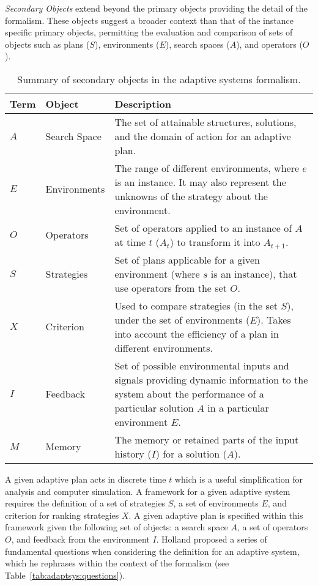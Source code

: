 \documentclass[a4paper, 11pt]{article}
\begin{document}
\emph{Secondary Objects} extend beyond the primary objects providing the detail of the formalism. These objects suggest a broader context than that of the instance specific primary objects, permitting the evaluation and comparison of sets of objects such as plans ($S$), environments ($E$), search spaces ($A$), and operators ($O$).

\begin{table}[ht]
	\centering\small
		\begin{tabularx}{\textwidth}{llX}
		\toprule
		\textbf{Term} & \textbf{Object} & \textbf{Description} \\ 
		\toprule
		$A$ & Search Space & The set of attainable structures, solutions, and the domain of action for an adaptive plan. \\ 
		\midrule
		$E$ & Environments & The range of different environments, where $e$ is an instance. It may also represent the unknowns of the strategy about the environment.  \\ 
		\midrule
		$O$ & Operators & Set of operators applied to an instance of $A$ at time $t$ ($A_t$) to transform it into $A_{t+1}$. \\ 
		\midrule
		$S$ & Strategies & Set of plans applicable for a given environment (where $s$ is an instance), that use operators from the set $O$.  \\ 
		\midrule
		$X$ & Criterion & Used to compare strategies (in the set $S$), under the set of environments ($E$). Takes into account the efficiency of a plan in different environments. \\ 
		\midrule
		$I$ & Feedback & Set of possible environmental inputs and signals providing dynamic information to the system about the performance of a particular solution $A$ in a particular environment $E$. \\ 
		\midrule
		$M$ & Memory & The memory or retained parts of the input history ($I$) for a solution ($A$). \\ 
		\bottomrule		
		\end{tabularx}	
	\caption{Summary of secondary objects in the adaptive systems formalism.}
	\label{tab:adaptsys:secondary}
\end{table}

A given adaptive plan acts in discrete time $t$ which is a useful simplification for analysis and computer simulation. A framework for a given adaptive system requires the definition of a set of strategies $S$, a set of environments $E$, and criterion for ranking strategies $X$. A given adaptive plan is specified within this framework given the following set of objects: a search space $A$, a set of operators $O$, and feedback from the environment $I$. Holland proposed a series of fundamental questions when considering the definition for an adaptive system, which he rephrases within the context of the formalism (see Table~\ref{tab:adaptsys:questions}).
\end{document}
